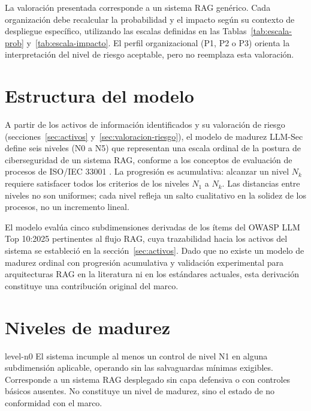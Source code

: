 \begin{infobox}
  La valoración presentada corresponde a un sistema RAG genérico. Cada organización debe recalcular la probabilidad y el impacto según su contexto de despliegue específico, utilizando las escalas definidas en las Tablas~\ref{tab:escala-prob} y~\ref{tab:escala-impacto}. El perfil organizacional (P1, P2 o P3) orienta la interpretación del nivel de riesgo aceptable, pero no reemplaza esta valoración.
\end{infobox}

\section{Estructura del modelo}

A partir de los activos de información identificados y su valoración de riesgo (secciones~\ref{sec:activos} y~\ref{sec:valoracion-riesgo}), el modelo de madurez LLM-Sec define seis niveles (N0 a N5) que representan una escala ordinal de la postura de ciberseguridad de un sistema RAG, conforme a los conceptos de evaluación de procesos de ISO/IEC 33001 \cite{iso33001}. La progresión es acumulativa: alcanzar un nivel $N_k$ requiere satisfacer todos los criterios de los niveles $N_1$ a $N_{k}$. Las distancias entre niveles no son uniformes; cada nivel refleja un salto cualitativo en la solidez de los procesos, no un incremento lineal.

El modelo evalúa cinco subdimensiones derivadas de los ítems del OWASP LLM Top 10:2025 \cite{owasp2025} pertinentes al flujo RAG, cuya trazabilidad hacia los activos del sistema se estableció en la sección~\ref{sec:activos}. Dado que no existe un modelo de madurez ordinal con progresión acumulativa y validación experimental para arquitecturas RAG en la literatura ni en los estándares actuales, esta derivación constituye una contribución original del marco.

\section{Niveles de madurez}

\begin{levelbox}[title=N0: No conforme]{level-n0}
  El sistema incumple al menos un control de nivel N1 en alguna subdimensión aplicable, operando sin las salvaguardas mínimas exigibles. Corresponde a un sistema RAG desplegado sin capa defensiva o con controles básicos ausentes. No constituye un nivel de madurez, sino el estado de no conformidad con el marco.
\end{levelbox}
\vspace{8pt}

